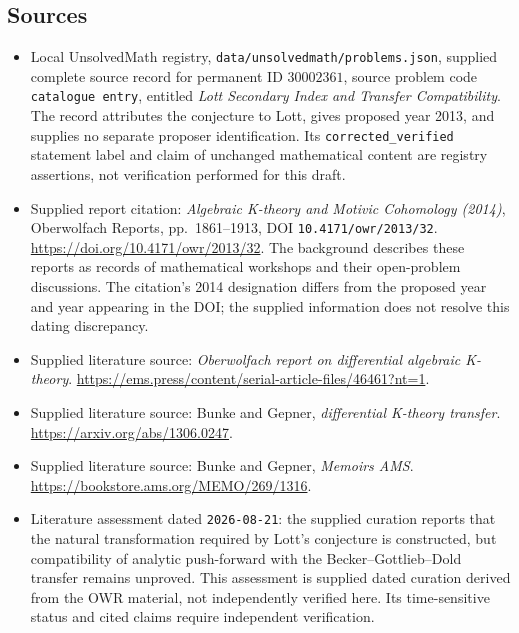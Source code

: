 \documentclass[11pt]{article}
\begin{document}
\subsection{Sources}
\begin{itemize}
\item Local UnsolvedMath registry, \texttt{data/unsolvedmath/problems.json}, supplied complete source record for permanent ID \(30002361\), source problem code \texttt{catalogue entry}, entitled \emph{Lott Secondary Index and Transfer Compatibility}. The record attributes the conjecture to Lott, gives proposed year 2013, and supplies no separate proposer identification. Its \texttt{corrected\_verified} statement label and claim of unchanged mathematical content are registry assertions, not verification performed for this draft.
\item Supplied report citation: \emph{Algebraic K-theory and Motivic Cohomology (2014)}, Oberwolfach Reports, pp.\ 1861--1913, DOI \texttt{10.4171/owr/2013/32}. \url{https://doi.org/10.4171/owr/2013/32}. The background describes these reports as records of mathematical workshops and their open-problem discussions. The citation's 2014 designation differs from the proposed year and year appearing in the DOI; the supplied information does not resolve this dating discrepancy.
\item Supplied literature source: \emph{Oberwolfach report on differential algebraic K-theory}. \url{https://ems.press/content/serial-article-files/46461?nt=1}.
\item Supplied literature source: Bunke and Gepner, \emph{differential K-theory transfer}. \url{https://arxiv.org/abs/1306.0247}.
\item Supplied literature source: Bunke and Gepner, \emph{Memoirs AMS}. \url{https://bookstore.ams.org/MEMO/269/1316}.
\item Literature assessment dated \texttt{2026-08-21}: the supplied curation reports that the natural transformation required by Lott's conjecture is constructed, but compatibility of analytic push-forward with the Becker--Gottlieb--Dold transfer remains unproved. This assessment is supplied dated curation derived from the OWR material, not independently verified here. Its time-sensitive status and cited claims require independent verification.
\end{itemize}
\end{document}
